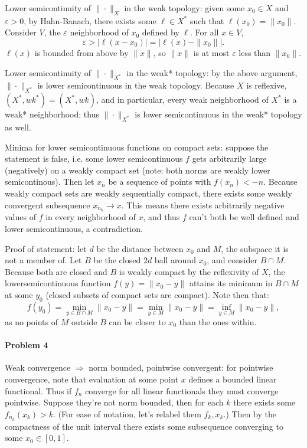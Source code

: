 \documentclass[12pt]{article}
\begin{document}
Lower semicontinuity of $\|\cdot\|_X$ in the weak topology: given some $x_0\in X$
and $\varepsilon >0$, by Hahn-Banach, there exists some $\ell\in X^*$ such that
$\ell(x_0) = \|x_0\|$. Consider $V$, the $\varepsilon$ neighborhood of $x_0$
defined by $\ell$. For all $x\in V$,
\begin{displaymath}
  \varepsilon >|\ell(x-x_0)| = |\ell(x)-\|x_0\||.
\end{displaymath}
$\ell(x)$ is bounded from above by $\|x\|$, so $\|x\|$ is at most $\varepsilon$
less than $\|x_0\|$.

Lower semicontinuity of $\|\cdot\|_{X^*}$ in the weak* topology: by the above
argument, $\|\cdot\|_{X^*}$ is lower semicontinuous in the weak topology. Because
$X$ is reflexive, $(X^*,wk^*) = (X^*,wk)$, and in particular, every weak
neighborhood of $X^*$ is a weak* neighborhood; thus $\|\cdot\|_{X^*}$ is lower
semicontinuous in the weak* topology as well.

Minima for lower semicontinuous functions on compact sets: suppose the statement
is false, i.e. some lower semicontinuous $f$ gets arbitrarily large (negatively)
on a weakly compact set (note: both norms are weakly lower semicontinous). Then
let $x_n$ be a sequence of points with $f(x_n) < -n$. Because weakly compact
sets are weakly sequentially compact, there exists some weakly convergent
subsequence $x_{n_k}\to x$. This means there exists arbitrarily negative values of
$f$ in every neighborhood of $x$, and thus $f$ can't both be well defined and
lower semicontinuous, a contradiction.

Proof of statement: let $d$ be the distance between $x_0$ and $M$, the subspace
it is not a member of. Let $B$ be the closed $2d$ ball around $x_0$, and consider
$B\cap M$. Because both are closed and $B$ is weakly compact by the reflexivity
of $X$, the lowersemicontinuous function $f(y) = \|x_0-y\|$ attains its minimum
in $B\cap M$ at some $y_0$ (closed subsets of compact sets are compact).
Note then that:
\begin{displaymath}
  f(y_0) = \min_{y\in B\cap M}\|x_0-y\| = \min_{y\in M}\|x_0-y\| = \inf_{y\in M}
  \|x_0-y\|,
\end{displaymath}
as no points of $M$ outside $B$ can be closer to $x_0$ than the ones within.

\paragraph{Problem 4}
Weak convergence $\Rightarrow$ norm bounded, pointwise convergent: for pointwise
convergence, note that evaluation at some point $x$ defines a bounded linear
functional. Thus if $f_n$ converge for all linear functionals they must converge
pointwise. Suppose they're not norm bounded, then for each $k$ there exists
some $f_{n_k}(x_k) > k$. (For ease of notation, let's relabel them $f_k,x_k$.)
Then by the compactness of the unit interval there exists some subsequence
converging to some $x_0 \in [0,1]$.
\end{document}
